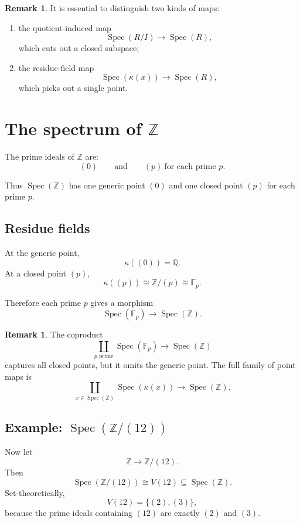 \documentclass[11pt]{article}
\theoremstyle{definition}
\newtheorem{remark}[theorem]{Remark}
\newcommand{\Z}{\mathbb{Z}}
\newcommand{\Q}{\mathbb{Q}}
\newcommand{\F}{\mathbb{F}}
\newcommand{\Spec}{\operatorname{Spec}}
\newcommand{\kk}[1]{\kappa\!\left(#1\right)}
\begin{document}
	\begin{remark}
		It is essential to distinguish two kinds of maps:
		
		\begin{enumerate}[label=\textbf{(\alph*)}]
			\item the quotient-induced map
			\[
			\Spec(R/I)\to \Spec(R),
			\]
			which cuts out a closed subspace;
			
			\item the residue-field map
			\[
			\Spec(\kk{x})\to \Spec(R),
			\]
			which picks out a single point.
		\end{enumerate}
	\end{remark}
	
	\section{The spectrum of \(\Z\)}
	
	The prime ideals of \(\Z\) are:
	\[
	(0)
	\qquad\text{and}\qquad
	(p)\ \text{for each prime }p.
	\]
	
	Thus \(\Spec(\Z)\) has one generic point \((0)\) and one closed point \((p)\) for each prime \(p\).
	
	\subsection{Residue fields}
	
	At the generic point,
	\[
	\kk{(0)}=\Q.
	\]
	At a closed point \((p)\),
	\[
	\kk{(p)}\cong \Z/(p)\cong \F_p.
	\]
	
	Therefore each prime \(p\) gives a morphism
	\[
	\Spec(\F_p)\to \Spec(\Z).
	\]
	
	\begin{remark}
		The coproduct
		\[
		\coprod_{p\text{ prime}}\Spec(\F_p)\to \Spec(\Z)
		\]
		captures all closed points, but it omits the generic point. The full family of point maps is
		\[
		\coprod_{x\in \Spec(\Z)}\Spec(\kk{x})\to \Spec(\Z).
		\]
	\end{remark}
	
	\subsection{Example: \(\Spec(\Z/(12))\)}
	
	Now let
	\[
	\Z\to \Z/(12).
	\]
	Then
	\[
	\Spec(\Z/(12))\cong V(12)\subseteq \Spec(\Z).
	\]
	Set-theoretically,
	\[
	V(12)=\{(2),(3)\},
	\]
	because the prime ideals containing \((12)\) are exactly \((2)\) and \((3)\).
	
\end{document}
